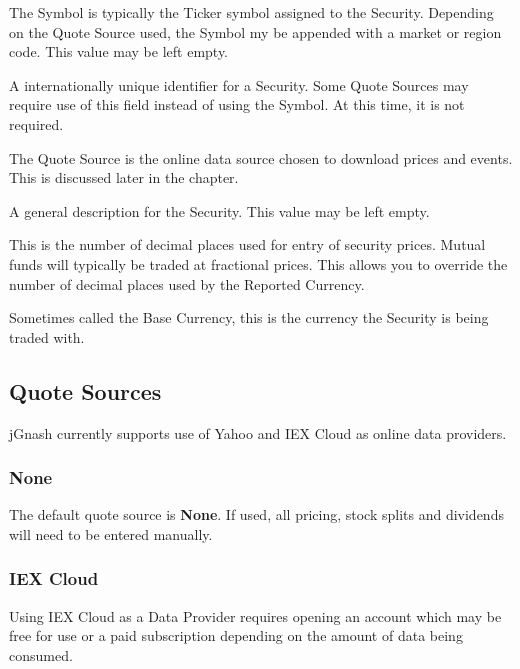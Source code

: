 \documentclass[letterpaper,12pt]{book}
\begin{document}
    \begin{description}[style=nextline]
        \item[Symbol \textit{(required)}]
        The Symbol is typically the Ticker symbol assigned to the Security.  Depending on the Quote Source used,
        the Symbol my be appended with a market or region code. This value may be left empty.
        \item[CUSIP / ISIN]
        A internationally unique identifier for a Security.  Some Quote Sources may require use of this field
        instead of using the Symbol.  At this time, it is not required. 
        \item[Quote Source \textit{(required)}]
        The Quote Source is the online data source chosen to download prices and events.  This is discussed later 
        in the chapter.
        \item[Description]
        A general description for the Security.  This value may be left empty.
        \item[Scale \textit{(required)}]
        This is the number of decimal places used for entry of security prices.  Mutual funds will typically
        be traded at fractional prices.  This allows you to override the number of decimal places used by the
        Reported Currency.
        \item[Reported Currency \textit{(required)}]
        Sometimes called the Base Currency, this is the currency the Security is being traded with.        
    \end{description}        
    
    \subsection{Quote Sources}
       
    jGnash currently supports use of Yahoo and IEX Cloud as online data providers.  
    
    \subsubsection{None}
    The default quote source is \textbf{None}.  If used, all pricing, stock splits and dividends will
    need to be entered manually.
    
    \subsubsection{IEX Cloud}
    Using IEX Cloud as a Data Provider requires opening an account which may be free for use or a paid
    subscription depending on the amount of data being consumed. 
    
\end{document}
